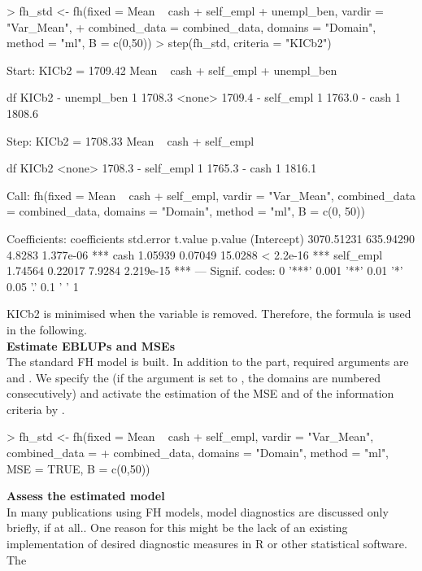\begin{example}
> fh_std <- fh(fixed = Mean ~ cash + self_empl + unempl_ben, vardir = "Var_Mean",
+   combined_data = combined_data, domains = "Domain", method = "ml", B = c(0,50))
> step(fh_std, criteria = "KICb2")

Start: KICb2 = 1709.42
Mean ~ cash + self_empl + unempl_ben

            df  KICb2
- unempl_ben 1 1708.3
<none>         1709.4
- self_empl  1 1763.0
- cash       1 1808.6

Step: KICb2 = 1708.33
Mean ~ cash + self_empl

            df  KICb2
<none>         1708.3
- self_empl  1 1765.3
- cash       1 1816.1


Call:
fh(fixed = Mean ~ cash + self_empl, vardir = "Var_Mean",
    combined_data = combined_data,
    domains = "Domain", method = "ml", B = c(0, 50))

Coefficients:
             coefficients  std.error t.value   p.value
(Intercept)   3070.51231  635.94290  4.8283 1.377e-06 ***
cash             1.05939    0.07049 15.0288 < 2.2e-16 ***
self_empl        1.74564    0.22017  7.9284 2.219e-15 ***
---
Signif. codes: 0 '***' 0.001 '**' 0.01 '*' 0.05 '.' 0.1 ' ' 1
\end{example}
KICb2 is minimised when the variable  is removed. Therefore,
the formula  is used in the following.\\ \newline
\textbf{Estimate EBLUPs and MSEs} \\
The standard FH model is built. In addition to the  part, required
arguments are  and . We specify the 
(if the  argument is set to , the domains are numbered
consecutively) and activate the estimation of the MSE and of the information criteria by \citet{Marhuenda2014}.
\begin{example}
> fh_std <- fh(fixed = Mean ~ cash + self_empl, vardir = "Var_Mean", combined_data =
+   combined_data, domains = "Domain", method = "ml", MSE = TRUE, B = c(0,50))
\end{example}
\textbf{Assess the estimated model} \\
In many publications using FH models, model diagnostics are discussed only briefly, if at all.. One reason for this might be the lack of an existing implementation of desired diagnostic measures in R or other statistical software. The 
